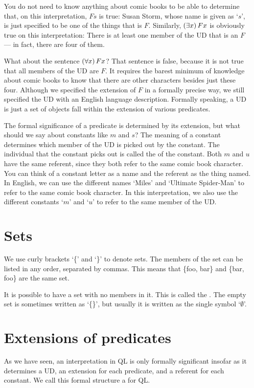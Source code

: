 You do not need to know anything about comic books to be able to determine that, on this interpretation, $Fs$ is true: Susan Storm, whose name is given as `$s$', is just specified to be one of the things that is $F$. Similarly, $(\exists x) \, Fx$ is obviously true on this interpretation: There is at least one member of the UD that is an $F$ --- in fact, there are four of them.

What about the sentence $(\forall x) \, Fx$? That sentence is false, because it is not true that all members of the UD are $F$. It requires the barest minimum of knowledge about comic books to know that there are other characters besides just these four. Although we specified the extension of $F$ in a formally precise way, we still specified the UD with an English language description. Formally speaking, a UD is just a set of {\color{black}objects fall within the extension of various predicates.}

The formal significance of a predicate is determined by its extension, but what should we say about constants like $m$ and $s$? The meaning of a constant determines which member of the UD is picked out by the constant. The individual that the constant picks out is called the  of the constant. Both $m$ and $u$ have the same referent, since they both refer to the same comic book character. You can think of a constant letter as a name and the referent as the thing named. In English, we can use the different names `Miles' and `Ultimate Spider-Man' to refer to the same comic book character. In this interpretation, we also use the different constants `$m$' and `$u$' to refer to the same member of the UD.

\section{Sets}

We use curly brackets `\{' and `\}' to denote sets. The members of the set can be listed in any order, separated by commas. This means that \{foo, bar\} and \{bar, foo\} are the same set.

It is possible to have a set with no members in it. This is called the . The empty set is sometimes written as `\{\}', but usually it is written as the single symbol `$\emptyset$'.

\section{Extensions of predicates}
As we have seen, an interpretation in QL is only formally significant insofar as it determines a UD, an extension for each predicate, and a referent for each constant. We call this formal structure a  for QL.

